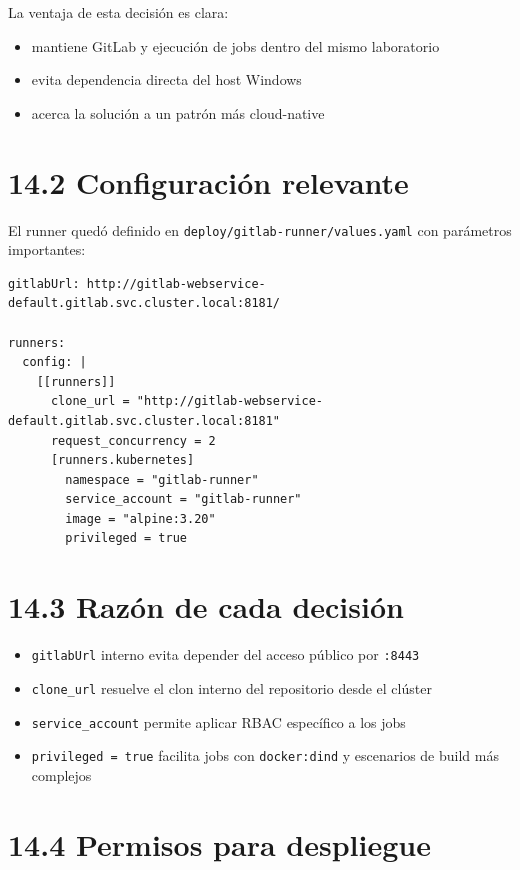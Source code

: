 \documentclass[
a4paper,
12pt]{report}
\providecommand{\tightlist}{%
  \setlength{\itemsep}{0pt}\setlength{\parskip}{0pt}}
\begin{document}
La ventaja de esta decisión es clara:

\begin{itemize}
\tightlist
\item
  mantiene GitLab y ejecución de jobs dentro del mismo laboratorio
\item
  evita dependencia directa del host Windows
\item
  acerca la solución a un patrón más cloud-native
\end{itemize}

\section{14.2 Configuración relevante}\label{configuraciuxf3n-relevante}

El runner quedó definido en \texttt{deploy/gitlab-runner/values.yaml}
con parámetros importantes:

\begin{verbatim}
gitlabUrl: http://gitlab-webservice-default.gitlab.svc.cluster.local:8181/

runners:
  config: |
    [[runners]]
      clone_url = "http://gitlab-webservice-default.gitlab.svc.cluster.local:8181"
      request_concurrency = 2
      [runners.kubernetes]
        namespace = "gitlab-runner"
        service_account = "gitlab-runner"
        image = "alpine:3.20"
        privileged = true
\end{verbatim}

\section{14.3 Razón de cada
decisión}\label{razuxf3n-de-cada-decisiuxf3n}

\begin{itemize}
\tightlist
\item
  \texttt{gitlabUrl} interno evita depender del acceso público por
  \texttt{:8443}
\item
  \texttt{clone\_url} resuelve el clon interno del repositorio desde el
  clúster
\item
  \texttt{service\_account} permite aplicar RBAC específico a los jobs
\item
  \texttt{privileged\ =\ true} facilita jobs con \texttt{docker:dind} y
  escenarios de build más complejos
\end{itemize}

\section{14.4 Permisos para despliegue}\label{permisos-para-despliegue}
\end{document}
